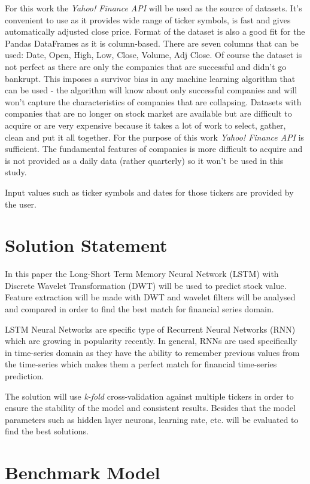 For this work the \emph{Yahoo! Finance API} will be used as the source of datasets. It's convenient to use as it provides wide range of ticker symbols, is fast and gives automatically adjusted close price. Format of the dataset is also a good fit for the Pandas DataFrames as it is column-based. There are seven columns that can be used: Date, Open, High, Low, Close, Volume, Adj Close. Of course the dataset is not perfect as there are only the companies that are successful and didn't go bankrupt. This imposes a survivor bias in any machine learning algorithm that can be used - the algorithm will know about only successful companies and will won't capture the characteristics of companies that are collapsing. Datasets with companies that are no longer on stock market are available but are difficult to acquire or are very expensive because it takes a lot of work to select, gather, clean and put it all together. For the purpose of this work \emph{Yahoo! Finance API} is sufficient. The fundamental features of companies is more difficult to acquire and is not provided as a daily data (rather quarterly) so it won't be used in this study.

Input values such as ticker symbols and dates for those tickers are provided by the user.

\section*{Solution Statement}

In this paper the Long-Short Term Memory Neural Network (LSTM) with Discrete Wavelet Transformation (DWT) will be used to predict stock value.
Feature extraction will be made with DWT and wavelet filters will be analysed and compared in order to find the best match for financial series domain.

LSTM Neural Networks are specific type of Recurrent Neural Networks (RNN) which are growing in popularity recently.
In general, RNNs are used specifically in time-series domain as they have the ability to remember previous values from the time-series which makes them a perfect match for financial time-series prediction.

The solution will use \emph{k-fold} cross-validation against multiple tickers in order to ensure the stability of the model and consistent results. Besides that the model parameters such as hidden layer neurons, learning rate, etc. will be evaluated to find the best solutions.


\section*{Benchmark Model}

